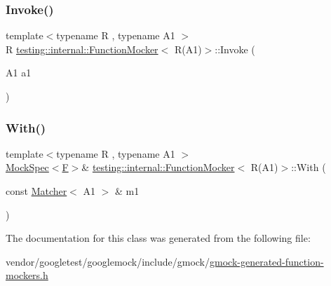 \subsubsection{\texorpdfstring{Invoke()}{Invoke()}}
{\footnotesize\ttfamily template$<$typename R , typename A1 $>$ \\
R \hyperlink{classtesting_1_1internal_1_1_function_mocker}{testing\+::internal\+::\+Function\+Mocker}$<$ R(A1)$>$\+::Invoke (\begin{DoxyParamCaption}\item[{A1}]{a1 }\end{DoxyParamCaption})\hspace{0.3cm}{\ttfamily [inline]}}

\mbox{\label{classtesting_1_1internal_1_1_function_mocker_3_01_r_07_a1_08_4_aa61b5c24c52b8c49713774c49a01b26e}} 
\subsubsection{\texorpdfstring{With()}{With()}}
{\footnotesize\ttfamily template$<$typename R , typename A1 $>$ \\
\hyperlink{classtesting_1_1internal_1_1_mock_spec}{Mock\+Spec}$<$\hyperlink{classtesting_1_1internal_1_1_function_mocker_3_01_r_07_a1_08_4_ada54286442ab14a18c2308cef748848f}{F}$>$\& \hyperlink{classtesting_1_1internal_1_1_function_mocker}{testing\+::internal\+::\+Function\+Mocker}$<$ R(A1)$>$\+::With (\begin{DoxyParamCaption}\item[{const \hyperlink{classtesting_1_1_matcher}{Matcher}$<$ A1 $>$ \&}]{m1 }\end{DoxyParamCaption})\hspace{0.3cm}{\ttfamily [inline]}}



The documentation for this class was generated from the following file\+:\begin{DoxyCompactItemize}
\item 
vendor/googletest/googlemock/include/gmock/\hyperlink{gmock-generated-function-mockers_8h}{gmock-\/generated-\/function-\/mockers.\+h}\end{DoxyCompactItemize}
